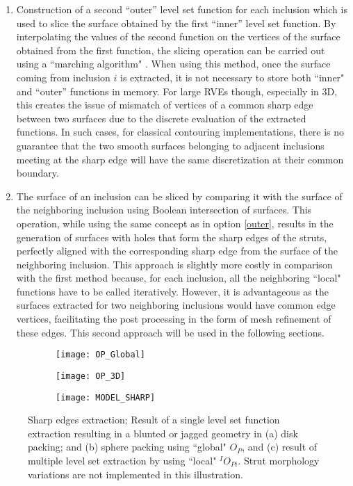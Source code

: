 \begin{enumerate}
	\item Construction of a second ``outer'' level set function for each inclusion which is used to slice the surface obtained by the first ``inner'' level set function. By interpolating the values of the second function on the vertices of the surface obtained from the first function, the slicing operation can be carried out using a ``marching algorithm" \cite{sononAdvancedApproachGeneration2015}\label{outer}. When using this method, once the surface coming from inclusion $ i $ is extracted, it is not necessary to store both ``inner" and ``outer'' functions in memory. For large RVEs though, especially in 3D, this creates the issue of mismatch of vertices of a common sharp edge between two surfaces	due to the discrete evaluation of the extracted functions. In such cases, for classical contouring implementations, there is no guarantee that the two smooth surfaces belonging to adjacent inclusions meeting at the sharp edge will have the same discretization at their common boundary.
	\item The surface of an inclusion can be sliced by comparing it with the surface of the neighboring inclusion using Boolean intersection of surfaces. This operation, while using the same concept as in option \ref{outer}, results in the generation of surfaces with holes that form the sharp edges of the struts, perfectly aligned with the corresponding sharp edge from the surface of the neighboring inclusion.\label{inner} This approach is slightly more costly in comparison with the first method because, for each inclusion, all the neighboring ``local" functions have to be called iteratively. However, it is advantageous as the surfaces extracted for two neighboring inclusions would have common edge vertices, facilitating the post processing in the form of mesh refinement of these edges. This second approach will be used in the following sections.
\end{enumerate}


\begin{figure}
	\centering
	\begin{subfigure}[b]{0.33\textwidth}
		\texttt{[image: OP\_Global]}
		\caption{}
	\end{subfigure}
	\begin{subfigure}[b]{0.33\textwidth}
		\texttt{[image: OP\_3D]}
		\caption{}
	\end{subfigure}
	\begin{subfigure}[b]{0.32\textwidth}
		\texttt{[image: MODEL\_SHARP]}
		\caption{}
	\end{subfigure}
	\caption{Sharp edges extraction; Result of a single level set function extraction resulting in a blunted or jagged geometry in (a) disk packing; and (b) sphere packing using ``global" $ O_P $, and (c) result of multiple level set extraction by using ``local" $ ^IO_{Pi} $. Strut morphology variations are not implemented in this illustration. }\label{sharp1}
\end{figure}

